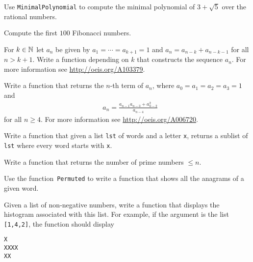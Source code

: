 \begin{prob}	\label{prob:minpoly}
	Use \lstinline{MinimalPolynomial} to compute the minimal polynomial of
	$3+\sqrt{5}$ over the rational numbers.
\end{prob}
%
\begin{prob}\label{prob:fibo100}
	Compute the first $100$ Fibonacci numbers.
\end{prob}

\begin{prob}\label{prob:fibok}
	For $k\in\mathbb{N}$ let $a_n$ be given by $a_1=\cdots=a_{k+1}=1$ and
	$a_n=a_{n-k}+a_{n-k-1}$ for all $n>k+1$. Write a function depending on $k$
	that constructs the sequence $a_{n}$.  For more information see 
	\url{http://oeis.org/A103379}.
\end{prob}

\begin{prob}\label{prob:somos}
	Write a function that returns the $n$-th term of $a_n$, where 
	$a_0=a_1=a_2=a_3=1$ and  
	\begin{align*}
	&a_n=\frac{a_{n-1}a_{n-3}+a_{n-2}^2}{a_{n-4}}
	\end{align*}
	for all $n\geq4$. For more information see \url{http://oeis.org/A006720}.
\end{prob}

\begin{prob}\label{prob:xwords}
	Write a function that given a list \lstinline{lst} of words and a letter
	\lstinline{x}, returns a sublist of \lstinline{lst} where every word starts
	with \lstinline{x}. 
\end{prob}

\begin{prob}\label{prob:number-primes}
	Write a function that returns the number of prime numbers $\leq n$. 
\end{prob}

\begin{prob}\label{prob:anagrams}
	Use the function~\lstinline{Permuted} to write a function that shows all
	the anagrams of a given word. 
\end{prob}

\begin{prob}\label{prob:histogram}
	Given a list of non-negative numbers, write a function that displays the
	histogram associated with this list. For example, if the argument is the
	list \lstinline{[1,4,2]}, the function should display 
\begin{lstlisting}
X
XXXX
XX
\end{lstlisting}
\end{prob}

